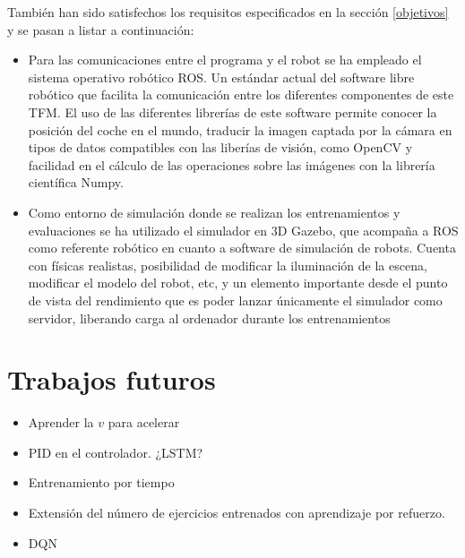 
También han sido satisfechos los requisitos especificados en la sección \ref{objetivos} y se pasan a listar a continuación:\\

\begin{itemize}
    \item Para las comunicaciones entre el programa y el robot se ha empleado el sistema operativo robótico ROS. Un estándar actual del software libre robótico que facilita la comunicación entre los diferentes componentes de este TFM. El uso de las diferentes librerías de este software permite conocer la posición del coche en el mundo, traducir la imagen captada por la cámara en tipos de datos compatibles con las liberías de visión, como OpenCV y facilidad en el cálculo de las operaciones sobre las imágenes con la librería científica Numpy.\\
    
    \item Como entorno de simulación donde se realizan los entrenamientos y evaluaciones se ha utilizado el simulador en 3D Gazebo, que acompaña a ROS como referente robótico en cuanto a software de simulación de robots. Cuenta con físicas realistas, posibilidad de modificar la iluminación de la escena, modificar el modelo del robot, etc, y un elemento importante desde el punto de vista del rendimiento que es poder lanzar únicamente el simulador como servidor, liberando carga al ordenador durante los entrenamientos
\end{itemize}

\section{Trabajos futuros}

\begin{itemize}
    \item Aprender la $v$ para acelerar
    \item PID en el controlador. ¿LSTM?
    \item Entrenamiento por tiempo
    \item Extensión del número de ejercicios entrenados con aprendizaje por refuerzo.
    \item DQN
    
    
    
\end{itemize}